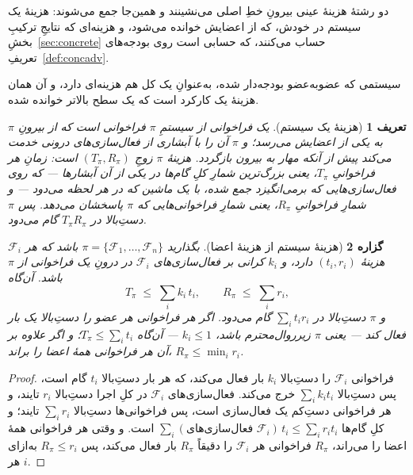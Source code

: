 \documentclass[10pt,oneside,openany]{book}
\newcommand{\F}{\mathcal{F}}
\theoremstyle{accentdef}
\newtheorem{definition}{تعریف}[chapter]
\theoremstyle{accentplain}
\newtheorem{proposition}[definition]{گزاره}
\begin{document}
دو رشتهٔ هزینهٔ عینی بیرونِ خطِ اصلی می‌نشینند و همین‌جا جمع می‌شوند: هزینهٔ
یک سیستم در خودش، که از اعضایش خوانده می‌شود، و هزینه‌ای که نتایجِ ترکیبِ
بخشِ~\ref{sec:concrete} حساب می‌کنند، که حسابی است روی بودجه‌های
تعریفِ~\ref{def:concadv}.

سیستمی که عضوبه‌عضو بودجه‌دار شده، به‌عنوانِ یک کل هم هزینه‌ای دارد، و آن
همان هزینهٔ یک کارکرد است که یک سطح بالاتر خوانده شده.

\begin{definition}[هزینهٔ یک سیستم]\label{def:syscost}
یک \emph{فراخوانی} از سیستمِ $\pi$ فراخوانی است که از بیرونِ $\pi$ به یکی از
اعضایش می‌رسد؛ و $\pi$ آن را با آبشاری از فعال‌سازی‌های درونی خدمت می‌کند
پیش از آنکه مهار به بیرون بازگردد. \emph{هزینهٔ} $\pi$ زوجِ $(T_\pi, R_\pi)$
است: \emph{زمانِ هر فراخوانیِ} $T_\pi$، یعنی بزرگ‌ترین شمارِ کلِ گام‌ها در
یکی از آن آبشارها --- که روی فعال‌سازی‌هایی که برمی‌انگیزد جمع شده، با یک
ماشین که در هر لحظه می‌دود --- و \emph{شمارِ فراخوانیِ} $R_\pi$، یعنی شمارِ
فراخوانی‌هایی که $\pi$ پاسخشان می‌دهد. پس $\pi$ دستِ‌بالا در $T_\pi R_\pi$
گام می‌دود.
\end{definition}

\begin{proposition}[هزینهٔ سیستم از هزینهٔ اعضا]\label{prop:syscost}
بگذارید $\pi = \{\F_1,\dots,\F_n\}$ باشد که هر $\F_i$ هزینهٔ $(t_i, r_i)$
دارد، و $k_i$ کرانی بر فعال‌سازی‌های $\F_i$ در درونِ یک فراخوانی از $\pi$
باشد. آن‌گاه
\[
  T_\pi \;\le\; \sum_{i} k_i\, t_i , \qquad R_\pi \;\le\; \sum_{i} r_i ,
\]
و $\pi$ دستِ‌بالا در $\sum_i t_i r_i$ گام می‌دود. اگر هر فراخوانی هر عضو را
دستِ‌بالا یک بار فعال کند --- یعنی $\pi$ زیرروال‌محترم باشد، $k_i \le 1$ ---
آن‌گاه $T_\pi \le \sum_i t_i$؛ و اگر علاوه بر آن هر فراخوانی همهٔ اعضا را
براند، $R_\pi \le \min_i r_i$.
\end{proposition}

\begin{proof}
فراخوانی $\F_i$ را دستِ‌بالا $k_i$ بار فعال می‌کند، که هر بار دستِ‌بالا
$t_i$ گام است، پس دستِ‌بالا $\sum_i k_i t_i$ خرج می‌کند. فعال‌سازی‌های
$\F_i$ در کلِ اجرا دستِ‌بالا $r_i$ تایند، و هر فراخوانی دستِ‌کم یک
فعال‌سازی است، پس فراخوانی‌ها دستِ‌بالا $\sum_i r_i$ تایند؛ و کلِ گام‌ها
$\sum_i (\text{فعال‌سازی‌های }\F_i)\, t_i \le \sum_i r_i t_i$ است. و وقتی هر
فراخوانی همهٔ اعضا را می‌راند، $R_\pi$ فراخوانی هر $\F_i$ را دقیقاً $R_\pi$
بار فعال می‌کند، پس $R_\pi \le r_i$ به‌ازای هر $i$.
\end{proof}
\end{document}
